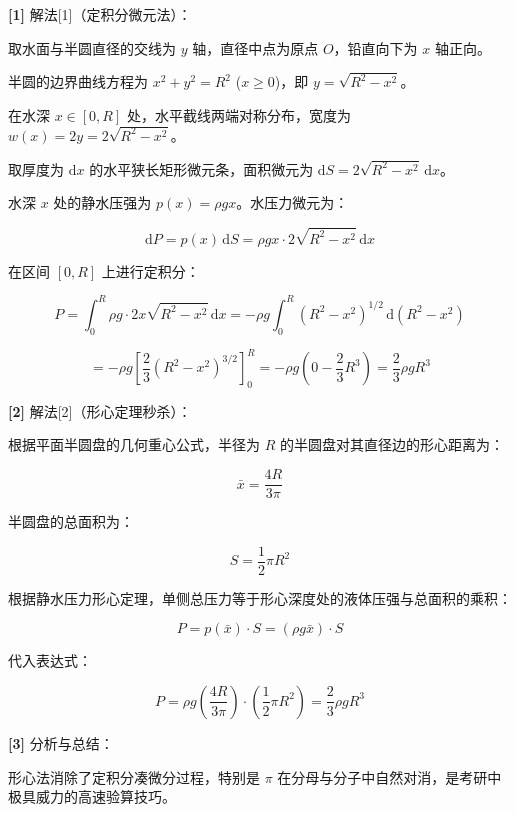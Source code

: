 \documentclass[11pt,a4paper,UTF8]{ctexart}
\begin{document}
\begin{solbox}[分步推导与答题规范]
\textbf{[1]} 解法[1]（定积分微元法）：

取水面与半圆直径的交线为 $y$ 轴，直径中点为原点 $O$，铅直向下为 $x$ 轴正向。

半圆的边界曲线方程为 $x^2 + y^2 = R^2$ ($x \geqslant 0$)，即 $y = \sqrt{R^2 - x^2}$。

在水深 $x \in [0, R]$ 处，水平截线两端对称分布，宽度为 $w(x) = 2y = 2\sqrt{R^2 - x^2}$。

取厚度为 $\mathrm{d}x$ 的水平狭长矩形微元条，面积微元为 $\mathrm{d}S = 2\sqrt{R^2 - x^2}\,\mathrm{d}x$。

水深 $x$ 处的静水压强为 $p(x) = \rho g x$。水压力微元为：


\begin{equation*}
\mathrm{d}P = p(x)\,\mathrm{d}S = \rho g x \cdot 2\sqrt{R^2 - x^2}\,\mathrm{d}x
\end{equation*}


在区间 $[0, R]$ 上进行定积分：


\begin{equation*}
P = \int_0^R \rho g \cdot 2x\sqrt{R^2 - x^2}\,\mathrm{d}x = -\rho g \int_0^R (R^2 - x^2)^{1/2}\,\mathrm{d}(R^2 - x^2)
\end{equation*}



\begin{equation*}
= -\rho g \left[\frac{2}{3}(R^2 - x^2)^{3/2}\right]_0^R = -\rho g \left(0 - \frac{2}{3}R^3\right) = \frac{2}{3}\rho g R^3
\end{equation*}


\textbf{[2]} 解法[2]（形心定理秒杀）：

根据平面半圆盘的几何重心公式，半径为 $R$ 的半圆盘对其直径边的形心距离为：


\begin{equation*}
\bar{x} = \frac{4R}{3\pi}
\end{equation*}


半圆盘的总面积为：


\begin{equation*}
S = \frac{1}{2}\pi R^2
\end{equation*}


根据静水压力形心定理，单侧总压力等于形心深度处的液体压强与总面积的乘积：


\begin{equation*}
P = p(\bar{x}) \cdot S = (\rho g \bar{x}) \cdot S
\end{equation*}


代入表达式：


\begin{equation*}
P = \rho g \left(\frac{4R}{3\pi}\right) \cdot \left(\frac{1}{2}\pi R^2\right) = \frac{2}{3}\rho g R^3
\end{equation*}


\textbf{[3]} 分析与总结：

形心法消除了定积分凑微分过程，特别是 $\pi$ 在分母与分子中自然对消，是考研中极具威力的高速验算技巧。
\end{solbox}
\end{document}
